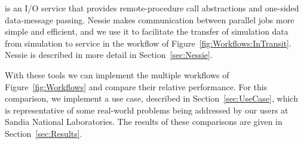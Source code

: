  is an I/O service that provides remote-procedure call
abstractions and one-sided data-message passing.  Nessie makes
communication between parallel jobs more simple and efficient, and we use
it to facilitate the transfer of simulation data from simulation to \vda
service in the \intransit workflow of Figure~\ref{fig:Workflows:InTransit}.
Nessie is described in more detail in Section~\ref{sec:Nessie}.

With these tools we can implement the multiple workflows of
Figure~\ref{fig:Workflows} and compare their relative performance.  For
this comparison, we implement a use case, described in
Section~\ref{sec:UseCase}, which is representative of some real-world
problems being addressed by our users at Sandia National Laboratories.  The
results of these comparisons are given in Section~\ref{sec:Results}.
